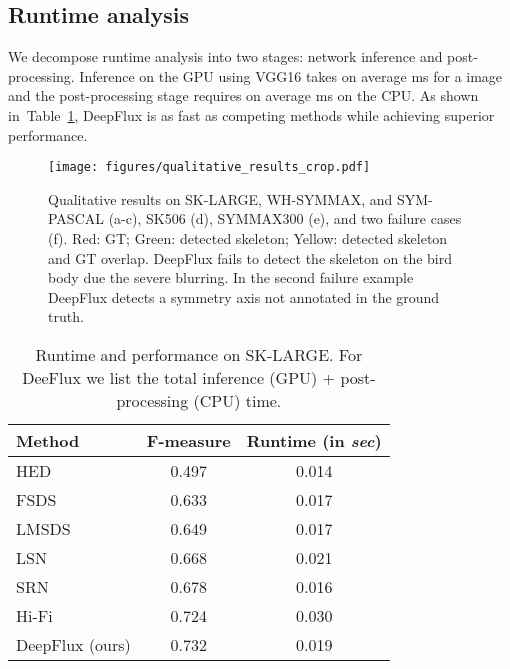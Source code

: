 \documentclass[10pt,twocolumn,letterpaper]{article}
\newcommand{\reftab}[1]{Table~\ref{#1}}
\begin{document}
{\subsection{Runtime analysis} \label{sec:runtime}
We decompose runtime analysis into two stages: network inference and post-processing.
Inference on the GPU using VGG16 takes on average \unit[14]{ms} for a  image and the post-processing stage requires on average \unit[5]{ms} on the CPU.
As shown in~\reftab{tab:runtime}, DeepFlux is as fast as competing methods while achieving superior performance.

\begin{figure*}
\centering
\texttt{[image: figures/qualitative\_results\_crop.pdf]}
\vskip 0.2cm
\caption{Qualitative results on SK-LARGE, WH-SYMMAX, and SYM-PASCAL (a-c), SK506 (d), SYMMAX300 (e), and two failure cases (f). Red: GT; Green: detected skeleton; Yellow: detected skeleton and GT overlap.
DeepFlux fails to detect the skeleton on the bird body due the severe blurring. In the second failure example DeepFlux detects a symmetry axis not annotated in the ground truth.
}
\label{fig:qualitativeresults}
\end{figure*}



\begin{table}
\begin{center}
\begin{tabular}{|l|c|c|}
\hline
Method & F-measure & Runtime (in \emph{sec}) \\
\hline\hline
HED~\cite{xie2015hed} & 0.497 & 0.014 \\
\hline
FSDS~\cite{shen2016fsds} & 0.633 & 0.017 \\
\hline
LMSDS~\cite{shen2017lmsds} & 0.649 & 0.017 \\
\hline
LSN~\cite{liu2018lsn} & 0.668 & 0.021 \\
\hline
SRN~\cite{ke2017srn} & 0.678 & 0.016 \\
\hline
Hi-Fi~\cite{zhao2018hifi} & 0.724 & 0.030 \\
\hline
DeepFlux (ours) & 0.732 & 0.019 \\
\hline
\end{tabular}
\end{center}
\caption{Runtime and performance on SK-LARGE. For DeeFlux we list the total inference (GPU) + post-processing (CPU) time. }
\label{tab:runtime}
\end{table}

}
\end{document}
